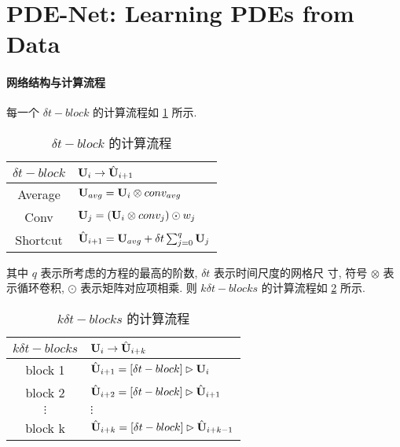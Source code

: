 \section{PDE-Net: Learning PDEs from Data}
\paragraph{网络结构与计算流程}
每一个 $\delta t-block$ 的计算流程如 \ref{tab:pde-net-dtblock} 所示.

\begin{table}[h]
\begin{tabular}{cl}
\toprule
$\delta t-block$ & ${\mathbf U}_i \to \hat {{\mathbf U}}_{i + 1}$ \\
\midrule
Average & ${\mathbf U}_{avg} = {\mathbf U}_i \otimes conv_{avg}$ \\
Conv & ${\mathbf U}_j = ({\mathbf U}_i \otimes conv_j) \odot w_j$ \\
Shortcut & $\hat {{\mathbf U}}_{i + 1} = {\mathbf U}_{avg} + \delta t \sum_{j=0}^q {\mathbf U}_j$ \\
\bottomrule
\end{tabular}
\caption{$\delta t-block$ 的计算流程}
\label{tab:pde-net-dtblock}
\end{table}

\noindent 其中 $q$ 表示所考虑的方程的最高的阶数, $\delta t$ 表示时间尺度的网格尺
寸, 符号 $\otimes$ 表示循环卷积, $\odot$ 表示矩阵对应项相乘. 则
$k\delta t-blocks$ 的计算流程如 \ref{tab:pde-net-kdtblocks} 所示.

\begin{table}[h]
\begin{tabular}{cl}
\toprule
$k\delta t-blocks$ & ${\mathbf U}_i \to \hat {{\mathbf U}}_{i + k}$ \\
\midrule
block 1 & $\hat {{\mathbf U}}_{i + 1} = [\delta t-block]\rhd{\mathbf U}_i$ \\
block 2 & $\hat {{\mathbf U}}_{i + 2} = [\delta t-block]\rhd\hat{{\mathbf U}}_{i + 1}$ \\
$\vdots$ & $\vdots$ \\
block k & $\hat {{\mathbf U}}_{i + k} = [\delta t-block]\rhd\hat{{\mathbf U}}_{i+k-1}$ \\
\bottomrule
\end{tabular}
\caption{$k\delta t-blocks$ 的计算流程}
\label{tab:pde-net-kdtblocks}
\end{table}

